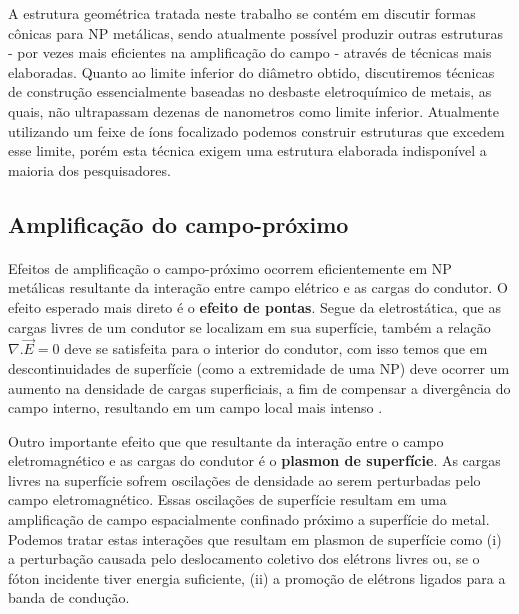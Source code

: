 A estrutura geométrica tratada neste trabalho se contém em discutir formas cônicas para NP metálicas, sendo atualmente possível produzir outras estruturas - por vezes mais eficientes na amplificação do campo - através de técnicas mais elaboradas. Quanto ao limite inferior do diâmetro obtido, discutiremos técnicas de construção essencialmente baseadas no desbaste eletroquímico de metais, as quais, não ultrapassam dezenas de nanometros como limite inferior. Atualmente utilizando um feixe de íons focalizado podemos construir estruturas que excedem esse limite, porém esta técnica exigem uma estrutura elaborada indisponível a maioria dos pesquisadores.

\subsection{Amplificação do campo-próximo}
\paragraph*{}

Efeitos de amplificação o campo-próximo ocorrem eficientemente em NP metálicas resultante da interação entre campo elétrico e as cargas do condutor. O efeito esperado mais direto é o \textbf{efeito de pontas}. Segue da eletrostática, que as cargas livres de um condutor se localizam em sua superfície, também a relação $ \nabla . \vec{E} = 0 $ deve se satisfeita para o interior do condutor, com isso temos que em descontinuidades de superfície (como a extremidade de uma NP) deve  ocorrer um aumento na densidade de cargas superficiais, a fim de compensar a divergência do campo interno, resultando em um campo local mais intenso \cite{jackson}.

Outro importante efeito que que resultante da interação entre o campo eletromagnético e as cargas do condutor é o \textbf{plasmon de superfície}. As cargas livres na superfície sofrem oscilações de densidade ao serem perturbadas pelo campo eletromagnético. Essas oscilações de superfície resultam em uma amplificação de campo espacialmente confinado próximo a superfície do metal. Podemos tratar estas interações que resultam em plasmon de superfície como (i) a perturbação causada pelo deslocamento coletivo dos elétrons livres ou, se o fóton incidente tiver energia suficiente, (ii) a promoção de elétrons ligados para a banda de condução.

